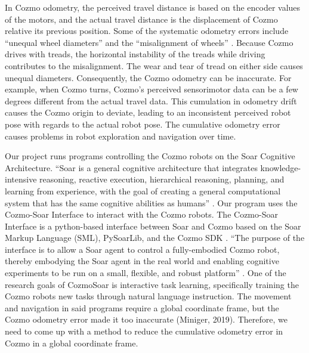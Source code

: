 \documentclass[jou,apacite]{apa6}
\begin{document}
In Cozmo odometry, the perceived travel distance is based on the encoder values of the motors, and the actual travel distance is the displacement of Cozmo relative its previous position. Some of the systematic odometry errors include “unequal wheel diameters” and the “misalignment of wheels” \cite{Borenstein}. Because Cozmo drives with treads, the horizontal instability of the treads while driving contributes to the misalignment. The wear and tear of tread on either side causes unequal diameters. Consequently, the Cozmo odometry can be inaccurate. For example, when Cozmo turns, Cozmo’s perceived sensorimotor data can be a few degrees different from the actual travel data. This cumulation in odometry drift causes the Cozmo origin to deviate, leading to an inconsistent perceived robot pose with regards to the actual robot pose. The cumulative odometry error causes problems in robot exploration and navigation over time.

Our project runs programs controlling the Cozmo robots on the Soar Cognitive Architecture. “Soar is a general cognitive architecture that integrates knowledge-intensive reasoning, reactive execution, hierarchical reasoning, planning, and learning from experience, with the goal of creating a general computational system that has the same cognitive abilities as humans” 
\cite{Laird}. Our program uses the Cozmo-Soar Interface to interact with the Cozmo robots. The Cozmo-Soar Interface is a python-based interface between Soar and Cozmo based on the Soar Markup Language (SML), PySoarLib, and the Cozmo SDK \cite{Mininger}. “The purpose of the interface is to allow a Soar agent to control a fully-embodied Cozmo robot, thereby embodying the Soar agent in the real world and enabling cognitive experiments to be run on a small, flexible, and robust platform” \cite{Boggs}. One of the research goals of CozmoSoar is interactive task learning, specifically training the Cozmo robots new tasks through natural language instruction. The movement and navigation in said programs require a global coordinate frame, but the Cozmo odometry error made it too inaccurate (Miniger, 2019). Therefore, we need to come up with a method to reduce the cumulative odometry error in Cozmo in a global coordinate frame.
\end{document}
